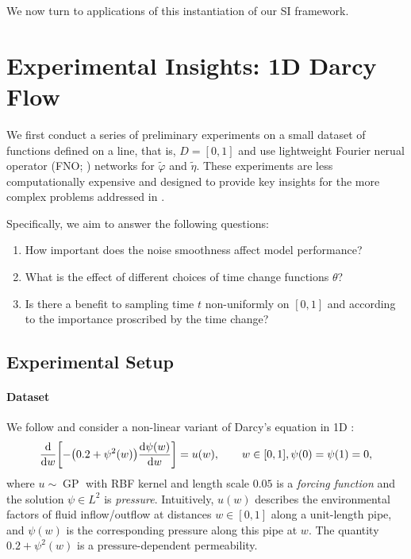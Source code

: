 We now turn to applications of this instantiation of our SI framework.

\section{Experimental Insights: 1D Darcy Flow} \label{sec:prelim}
We first conduct a series of preliminary experiments on a small dataset of functions defined on a line, that is, \(D = [0, 1]\) and use lightweight Fourier nerual operator (FNO; \citealp{li2020fourier}) networks for \(\widetilde{\varphi}\) and \(\widetilde{\eta}\). These experiments are less computationally expensive and designed to provide key insights for the more complex problems addressed in .

Specifically, we aim to answer the following questions:
\begin{enumerate}
  \item How important does the noise smoothness affect model performance?
  \item What is the effect of different choices of time change functions \(\theta\)?
  \item Is there a benefit to sampling time \(t\) non-uniformly on \([0, 1]\) and according to the importance proscribed by the time change?
\end{enumerate}
\subsection{Experimental Setup}
\paragraph{Dataset}
We follow \citep{bahmani2025resolution} and consider a non-linear variant of Darcy's equation in 1D \citep{whitaker1986flow}:
\begin{equation}
  \dv{w}\qty[-\qty(0.2 + \psi^{2}(w)) \dv{\psi(w)}{w}] = u(w), \qquad w \in [0, 1], \psi(0) = \psi(1) = 0,\label{eqn:d1d}
\end{equation}
where \(u \sim \operatorname{GP}\) with RBF kernel and length scale \(0.05\) is a \textit{forcing function} and the solution \(\psi \in L^{2}\) is \textit{pressure}. Intuitively,  \(u(w)\) describes the environmental factors of fluid inflow/outflow at distances \(w \in [0, 1]\) along a unit-length pipe, and \(\psi(w)\) is the corresponding pressure along this pipe at \(w\). The quantity \(0.2 + \psi^{2}(w)\) is a pressure-dependent permeability.

